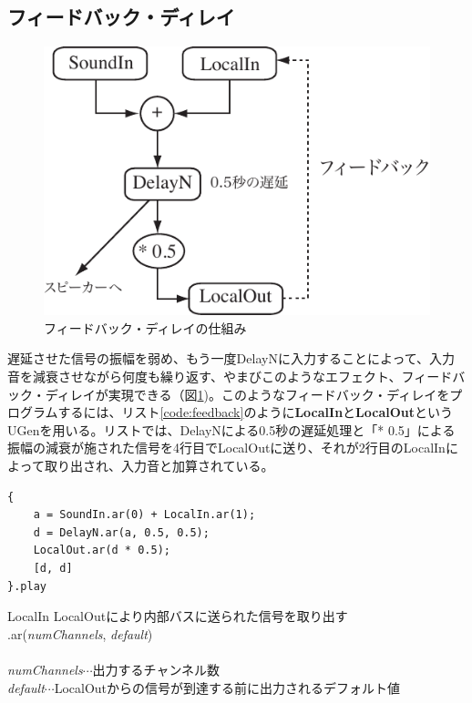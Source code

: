 \documentclass{jsarticle}
\begin{document}
\subsection{フィードバック・ディレイ}
\begin{figure}[htbp]
	\begin{center}
		\includegraphics[scale=0.7]{feedback.pdf}
	\end{center}
	\caption{フィードバック・ディレイの仕組み}
	\label{fig:feedback}
\end{figure}

遅延させた信号の振幅を弱め、もう一度DelayNに入力することによって、入力音を減衰させながら何度も繰り返す、やまびこのようなエフェクト、フィードバック・ディレイが実現できる（図\ref{fig:feedback})。このようなフィードバック・ディレイをプログラムするには、リスト\ref{code:feedback}のように{\bf LocalIn}と{\bf LocalOut}というUGenを用いる。リストでは、DelayNによる0.5秒の遅延処理と「* 0.5」による振幅の減衰が施された信号を4行目でLocalOutに送り、それが2行目のLocalInによって取り出され、入力音と加算されている。

\begin{lstlisting}[caption=フィードバック・ディレイ, label=code:feedback]
{
	a = SoundIn.ar(0) + LocalIn.ar(1);
	d = DelayN.ar(a, 0.5, 0.5);
	LocalOut.ar(d * 0.5);
	[d, d]
}.play
\end{lstlisting}

\begin{itembox}[l]{LocalIn}
	{\footnotesize 
	LocalOutにより内部バスに送られた信号を取り出す\\
	.ar({\it numChannels}, {\it default})\\\\
	{\it numChannels}$\cdots$出力するチャンネル数\\
	{\it default}$\cdots$LocalOutからの信号が到達する前に出力されるデフォルト値\\
	}
\end{itembox}
\end{document}

